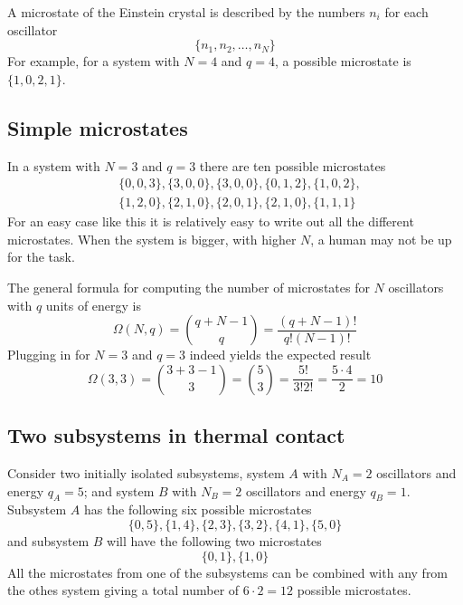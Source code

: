 \documentclass[10pt, a4paper]{amsart}
\begin{document}
A microstate of the Einstein crystal is described by the numbers $n_i$ for each oscillator
\begin{equation}
\{n_1,n_2,\dots,n_N\}
\end{equation}
For example, for a system with $N=4$ and $q=4$, a possible microstate is $\{1,0,2,1\}$.

\subsection{Simple microstates}
In a system with $N=3$ and $q=3$ there are ten possible microstates
\begin{align*}
&\{0,0,3\},\{3,0,0\},\{3,0,0\},\{0,1,2\},\{1,0,2\},\\
&\{1,2,0\},\{2,1,0\},\{2,0,1\},\{2,1,0\},\{1,1,1\}
\end{align*}
For an easy case like this it is relatively easy to write out all the different microstates. When the system is bigger, with higher $N$, a human may not be up for the task.

The general formula for computing the number of microstates for $N$ oscillators with $q$ units of energy is
\begin{equation}
\Omega(N,q)=\binom{q+N-1}{q}=\frac{(q+N-1)!}{q!(N-1)!}
\end{equation} 
Plugging in for $N=3$ and $q=3$ indeed yields the expected result
\begin{equation*}
\Omega(3,3)=\binom{3+3-1}{3}=\binom{5}{3}=\frac{5!}{3!2!}=\frac{5\cdot4}{2}=10
\end{equation*}

\subsection{Two subsystems in thermal contact}
Consider two initially isolated subsystems, system $A$ with $N_A=2$ oscillators and energy $q_A=5$; and system $B$ with $N_B=2$ oscillators and energy $q_B=1$. Subsystem $A$ has the following six possible microstates 
\begin{equation}
\{0,5\},\{1,4\},\{2,3\},\{3,2\},\{4,1\},\{5,0\}
\end{equation} 
and subsystem $B$ will have the following two microstates
\begin{equation}
\{0,1\},\{1,0\}
\end{equation}
All the microstates from one of the subsystems can be combined with any from the othes system giving a total number of $6\cdot2=12$ possible microstates.
\end{document}
